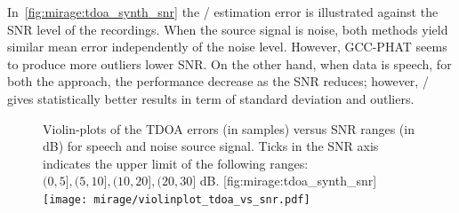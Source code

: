 \mynewline
In~\cref{fig:mirage:tdoa_synth_snr} the \TDOA/ estimation error is illustrated against the \ac{SNR} level of the recordings.
When the source signal is noise, both methods yield similar mean error independently of the noise level.
However, \ac{GCC-PHAT} seems to produce more outliers lower \ac{SNR}.
On the other hand, when data is speech, for both the approach, the performance decrease as the SNR reduces; however, \MIRAGE/ gives statistically better results in term of standard deviation and outliers.



\begin{figure}[h]
    \begin{sidecaption}[]{
        Violin-plots of the TDOA errors (in samples) versus SNR ranges (in dB) for speech and noise source signal. Ticks in the SNR axis indicates the upper limit of the following ranges: $(0,5], (5,10], (10,20], (20,30]$ dB.
    }[fig:mirage:tdoa_synth_snr]
    \centering
    \texttt{[image: mirage/violinplot\_tdoa\_vs\_snr.pdf]}
    \end{sidecaption}
\end{figure}


